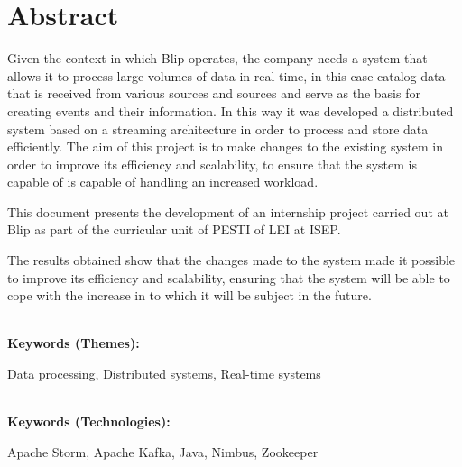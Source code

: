 \titleformat{\chapter}[display]
{\normalfont\bfseries}{}{0pt}{\Huge}

\chapter*{Abstract}

Given the context in which Blip operates, the company needs a system that allows it to process
large volumes of data in real time, in this case catalog data that is received from various sources 
and  sources and serve as the basis for creating events and their information. In this way it was 
developed a distributed system based on a streaming architecture in order to process and store 
data efficiently. The aim of this project is to make changes to the existing system in order to 
improve its efficiency and scalability, to ensure that the system is capable of is capable of 
handling an increased workload.

This document presents the development of an internship project carried out at Blip as part of the 
curricular unit of \ac{PESTI} of \ac{LEI} at \ac{ISEP}. 

The results obtained show that the changes made to the system made it possible to improve its
efficiency and scalability, ensuring that the system will be able to cope with the increase in
to which it will be subject in the future.

\textbf{\\Keywords (Themes):} 

Data processing, Distributed systems, Real-time systems

\textbf{\\Keywords (Technologies):} 

Apache Storm, Apache Kafka, Java, Nimbus, Zookeeper
